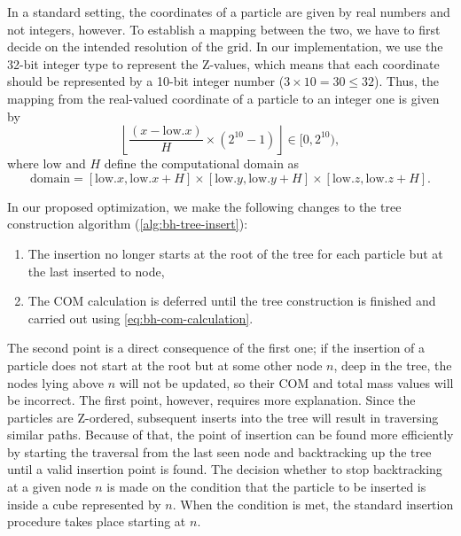 In a standard setting, the coordinates of a particle are given by real numbers and not integers, however.
To establish a mapping between the two, we have to first decide on the intended resolution of the grid.
In our implementation, we use the 32-bit integer type to represent the Z-values, which means that each coordinate should be represented by a 10-bit integer number ($3 \times 10 = 30 \leq 32$).
Thus, the mapping from the real-valued coordinate of a particle to an integer one is given by
\begin{equation*}
    \left\lfloor \frac{(x - \text{low}.x)}{H} \times (2^{10} - 1)\right\rfloor \in [0, 2^{10}),
\end{equation*}
where $\text{low}$ and $H$ define the computational domain as
\begin{equation*}
    \text{domain} = [\text{low}.x, \text{low}.x + H] \times [\text{low}.y, \text{low}.y + H] \times [\text{low}.z, \text{low}.z + H].
\end{equation*}

In our proposed optimization, we make the following changes to the tree construction algorithm (\autoref{alg:bh-tree-insert}):
\begin{enumerate}
    \item The insertion no longer starts at the root of the tree for each particle but at the last inserted to node,
    \item The COM calculation is deferred until the tree construction is finished and carried out using \autoref{eq:bh-com-calculation}.
\end{enumerate}
The second point is a direct consequence of the first one;
if the insertion of a particle does not start at the root but at some other node $n$, deep in the tree, the nodes lying above $n$ will not be updated, so their COM and total mass values will be incorrect.
The first point, however, requires more explanation.
Since the particles are Z-ordered, subsequent inserts into the tree will result in traversing similar paths.
Because of that, the point of insertion can be found more efficiently by starting the traversal from the last seen node and backtracking up the tree until a valid insertion point is found.
The decision whether to stop backtracking at a given node $n$ is made on the condition that the particle to be inserted is inside a cube represented by $n$.
When the condition is met, the standard insertion procedure takes place starting at $n$.

